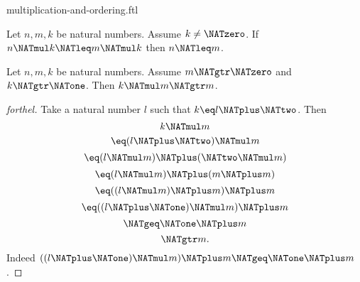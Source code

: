 \documentclass{naproche-library}
\begin{document}
\begin{smodule}[title=Multiplication and Ordering]{multiplication-and-ordering.ftl}
\begin{corollary}[forthel,id=ARITHMETIC_06_4374428949413888]
  Let $n, m, k$ be natural numbers.
  Assume $k \neq \NATzero$.
  If $n \NATmul k \NATleq m \NATmul k$ then $n \NATleq m$.
\end{corollary}

\begin{proposition}[forthel,id=ARITHMETIC_06_8813409145454592]
  Let $n, m, k$ be natural numbers.
  Assume $m \NATgtr \NATzero$ and $k \NATgtr \NATone$.
  Then $k \NATmul m \NATgtr m$.
\end{proposition}
\begin{proof}[forthel]
  Take a natural number $l$ such that $k \eq l \NATplus \NATtwo$.
  Then
  \[  k \NATmul m                       \]
  \[    \eq (l \NATplus \NATtwo) \NATmul m             \]
  \[    \eq (l \NATmul m) \NATplus (\NATtwo \NATmul m)   \]
  \[    \eq (l \NATmul m) \NATplus (m \NATplus m)       \]
  \[    \eq ((l \NATmul m) \NATplus m) \NATplus m       \]
  \[    \eq ((l \NATplus \NATone) \NATmul m) \NATplus m       \]
  \[    \NATgeq \NATone \NATplus m                    \]
  \[    \NATgtr m.                          \]
  Indeed $((l \NATplus \NATone) \NATmul m) \NATplus m \NATgeq \NATone \NATplus m$.
\end{proof}
\end{smodule}
\end{document}
